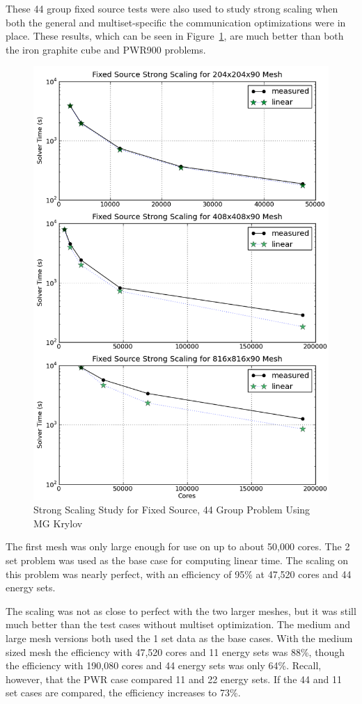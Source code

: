 These 44 group fixed source tests were also used to study strong scaling when both the general and multiset-specific the communication optimizations were in place. These results, which can be seen in Figure~\ref{fig:FxdStrong}, are much better than both the iron graphite cube and PWR900 problems. 
%
\begin{figure}[!h]
  \begin{center}
    \includegraphics [width=.8\textwidth, height=0.9\textheight ] {FxdSrcKrylovStrongScaling}
  \end{center}
  \caption{Strong Scaling Study for Fixed Source, 44 Group Problem Using MG Krylov}
  \label{fig:FxdStrong}
\end{figure}

The first mesh was only large enough for use on up to about 50,000 cores. The 2 set problem was used as the base case for computing linear time. The scaling on this problem was nearly perfect, with an efficiency of 95\% at 47,520 cores and 44 energy sets. 

The scaling was not as close to perfect with the two larger meshes, but it was still much better than the test cases without multiset optimization. The medium and large mesh versions both used the 1 set data as the base cases. With the medium sized mesh the efficiency with 47,520 cores and 11 energy sets was 88\%, though the efficiency with 190,080 cores and 44 energy sets was only 64\%. Recall, however, that the PWR case compared 11 and 22 energy sets. If the 44 and 11 set cases are compared, the efficiency increases to 73\%.

